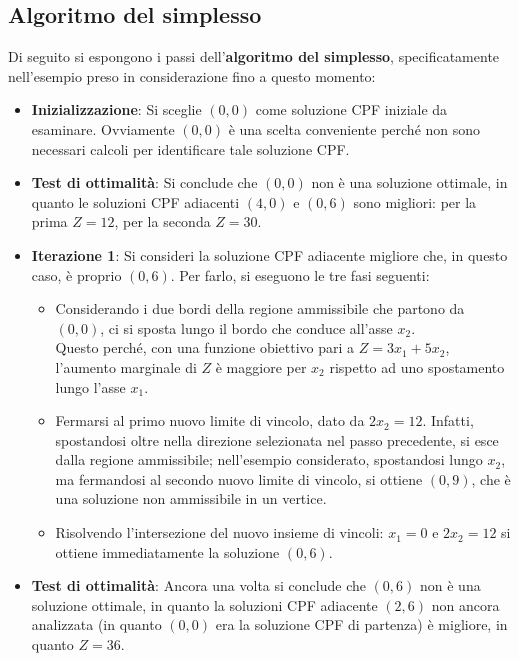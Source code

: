 \documentclass[a4paper]{extarticle}
\begin{document}
\vspace{1em}
\subsection{Algoritmo del simplesso}
Di seguito si espongono i passi dell'\textbf{algoritmo del simplesso}, specificatamente nell'esempio preso in considerazione fino a questo momento:

\begin{itemize}
    \item \textbf{Inizializzazione}: Si sceglie $(0,0)$ come soluzione CPF iniziale da esaminare. Ovviamente $(0,0)$ è una scelta conveniente perché non sono necessari calcoli per identificare tale soluzione CPF.
    \item \textbf{Test di ottimalità}: Si conclude che $(0,0)$ non è una soluzione ottimale, in quanto le soluzioni CPF adiacenti $(4,0)$ e $(0,6)$ sono migliori: per la prima $Z=12$, per la seconda $Z=30$.
    \item \textbf{Iterazione 1}: Si consideri la soluzione CPF adiacente migliore che, in questo caso, è proprio $(0,6)$. Per farlo, si eseguono le tre fasi seguenti:
    \begin{itemize}
        \item Considerando i due bordi della regione ammissibile che partono da $(0,0)$, ci si sposta lungo il bordo che conduce all'asse $x_2$.\\
        Questo perché, con una funzione obiettivo pari a $Z=3x_1 + 5x_2$, l'aumento marginale di $Z$ è maggiore per $x_2$ rispetto ad uno spostamento lungo l'asse $x_1$.
        \item Fermarsi al primo nuovo limite di vincolo, dato da $2x_2 = 12$. Infatti, spostandosi oltre nella direzione selezionata nel passo precedente, si esce dalla regione ammissibile; nell'esempio considerato, spostandosi lungo $x_2$, ma fermandosi al secondo nuovo limite di vincolo, si ottiene $(0,9)$, che è una soluzione non ammissibile in un vertice.
        \item Risolvendo l'intersezione del nuovo insieme di vincoli: $x_1 = 0$ e $2x_2 = 12$ si ottiene immediatamente la soluzione $(0,6)$.
    \end{itemize}
    \item \textbf{Test di ottimalità}: Ancora una volta si conclude che $(0,6)$ non è una soluzione ottimale, in quanto la soluzioni CPF adiacente $(2,6)$ non ancora analizzata (in quanto $(0,0)$ era la soluzione CPF di partenza) è migliore, in quanto $Z=36$.

\end{itemize}
\end{document}
